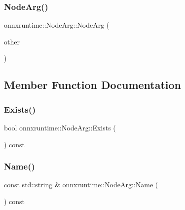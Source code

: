 \subsubsection{\texorpdfstring{Node\+Arg()}{NodeArg()}\hspace{0.1cm}{\footnotesize\ttfamily [2/2]}}
{\footnotesize\ttfamily onnxruntime\+::\+Node\+Arg\+::\+Node\+Arg (\begin{DoxyParamCaption}\item[{\mbox{\hyperlink{classonnxruntime_1_1NodeArg}{Node\+Arg}} \&\&}]{other }\end{DoxyParamCaption})\hspace{0.3cm}{\ttfamily [default]}}



\subsection{Member Function Documentation}
\mbox{\label{classonnxruntime_1_1NodeArg_a99beab4822723648598119666b965ab9}} 
\subsubsection{\texorpdfstring{Exists()}{Exists()}}
{\footnotesize\ttfamily bool onnxruntime\+::\+Node\+Arg\+::\+Exists (\begin{DoxyParamCaption}{ }\end{DoxyParamCaption}) const\hspace{0.3cm}{\ttfamily [noexcept]}}

\mbox{\label{classonnxruntime_1_1NodeArg_a62c3405e01502623320ff8f2f2d8b135}} 
\subsubsection{\texorpdfstring{Name()}{Name()}}
{\footnotesize\ttfamily const std\+::string \& onnxruntime\+::\+Node\+Arg\+::\+Name (\begin{DoxyParamCaption}{ }\end{DoxyParamCaption}) const\hspace{0.3cm}{\ttfamily [noexcept]}}

